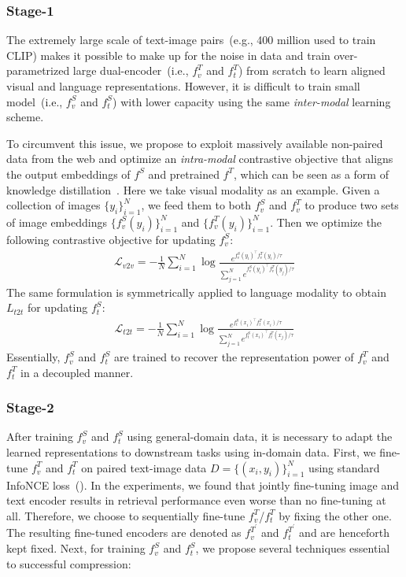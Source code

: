\subsubsection{Stage-1}
\label{stage1}
The extremely large scale of text-image pairs~(e.g., 400 million used to train CLIP) makes it possible to make up for the noise in data and train over-parametrized large dual-encoder~(i.e., $f_v^{T}$ and $f_t^{T}$) from scratch to learn aligned visual and language representations. However, it is difficult to train small model~(i.e., $f_v^{S}$ and $f_t^{S}$) with lower capacity using the same \textit{inter-modal} learning scheme.

To circumvent this issue, we propose to exploit massively available non-paired data from the web and optimize an \textit{intra-modal} contrastive objective that aligns the output embeddings of $f^{S}$ and pretrained $f^{T}$, which can be seen as a form of knowledge distillation~\cite{hinton2015distilling}. Here we take visual modality as an example. Given a collection of images $\{y_i\}_{i=1}^N$, we feed them to both $f_v^{S}$ and $f_v^{T}$ to produce two sets of image embeddings $\{f_v^{S}(y_i)\}_{i=1}^{N}$ and $\{f_v^{T}(y_i)\}_{i=1}^{N}$. Then we optimize the following contrastive objective for updating $f_v^{S}$:
\begin{align}
	\mathcal{L}_{v2v}=-\frac{1}{N}\sum_{i=1}^{N}\log{\frac{e^{f_v^{S}(y_i)^\top f_v^{T}(y_i)/\tau}}{\sum_{j=1}^{N}e^{f_v^{S}(y_i)^\top f_v^{T}(y_j)/\tau}}}
\end{align}
The same formulation is symmetrically applied to language modality to obtain $L_{t2t}$ for updating $f_t^{S}$:
\begin{align}
	\mathcal{L}_{t2t}=-\frac{1}{N}\sum_{i=1}^{N}\log{\frac{e^{f_t^{S}(x_i)^\top f_t^{T}(x_i)/\tau}}{\sum_{j=1}^{N}e^{f_t^{S}(x_i)^\top f_t^{T}(x_j)/\tau}}}
\end{align}
Essentially, $f_v^{S}$ and $f_t^{S}$ are trained to recover the representation power of $f_v^{T}$ and $f_t^{T}$ in a decoupled manner.

\subsubsection{Stage-2}
\label{stage2}
After training $f_v^{S}$ and $f_t^{S}$ using general-domain data, 
it is necessary to adapt the learned representations to downstream tasks 
using in-domain data. First, we fine-tune $f_v^{T}$ and $f_t^{T}$ on paired 
text-image data $D=\{(x_i, y_i)\}_{i=1}^{N}$ using standard InfoNCE loss~(). In the experiments, we found that jointly fine-tuning image 
and text encoder results in retrieval performance even worse than no fine-tuning at all. 
Therefore, we choose to sequentially fine-tune $f_v^{T}$/$f_t^{T}$ by fixing the other one. The resulting fine-tuned encoders are denoted as $f_v^{T^{\prime}}$ and $f_t^{T^{\prime}}$ and are henceforth kept fixed. Next, for training $f_v^{S}$ and $f_t^{S}$, we propose several techniques  essential to successful compression:

